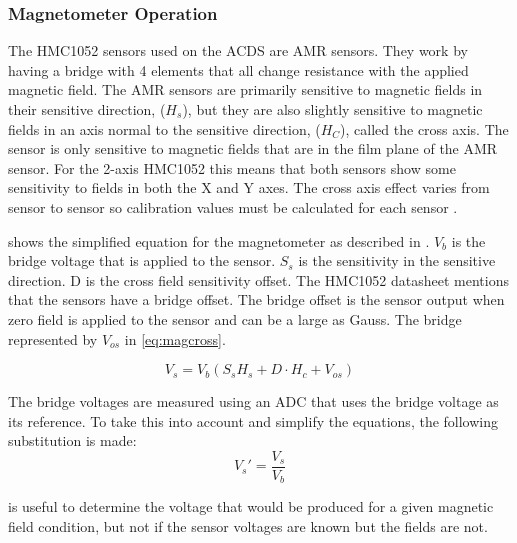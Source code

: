 \subsubsection{Magnetometer Operation}

The HMC1052 sensors used on the \ac{ACDS} are \ac{AMR} sensors. They work by having a bridge with 4 elements that all change resistance with the applied magnetic field. The \ac{AMR} sensors are primarily sensitive to magnetic fields in their sensitive direction, ($H_s$), but they are also slightly sensitive to magnetic fields in an axis normal to the sensitive direction, ($H_C$), called the cross axis. The sensor is only sensitive to magnetic fields that are in the film plane of the \ac{AMR} sensor. For the 2-axis HMC1052 this means that both sensors show some sensitivity to fields in both the X and Y axes. The cross axis effect varies from sensor to sensor  so calibration values must be calculated for each sensor \cite{AN215}.

 shows the simplified equation for the magnetometer as described in \cite{AN215}. $V_b$ is the bridge voltage that is applied to the sensor. $S_s$ is the sensitivity in the sensitive direction. D is the cross field sensitivity offset. The HMC1052 datasheet\cite{HMC1052} mentions that the sensors have a bridge offset. The bridge offset is the sensor output when zero field is applied to the sensor and can be a large as  Gauss. The bridge represented by $V_{os}$ in \cref{eq:magcross}.

\begin{equation}
    V_s = V_b \left(S_s H_s + D \cdot H_c + V_{os} \right)
    \label{eq:magcross}
\end{equation}
 
The bridge voltages are measured using an \ac{ADC} that uses the bridge voltage as its reference. To take this into account and simplify the equations, the following substitution is made:
\begin{equation}
    V_s'=\frac{V_s}{V_b}
    \label{eq:adcsub}
\end{equation}

 is useful to determine the voltage that would be produced for a given magnetic field condition, but not if the sensor voltages are known but the fields are not.

